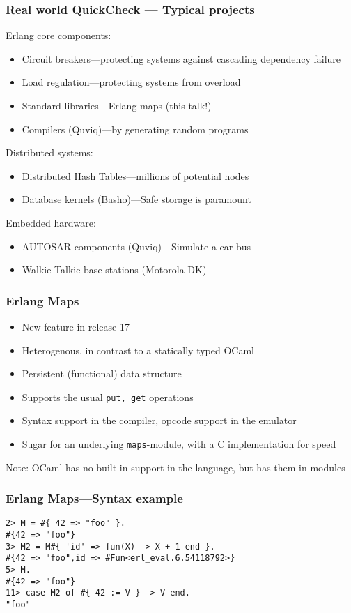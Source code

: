 \documentclass[lualatex]{beamer}
\begin{document}
\begin{frame}[fragile]
\frametitle{Real world QuickCheck — Typical projects}
Erlang core components:
\begin{itemize}
\item Circuit breakers—protecting systems against cascading dependency failure
\item Load regulation—protecting systems from overload
\item Standard libraries—Erlang maps (this talk!)
\item Compilers (Quviq)—by generating random programs
\end{itemize}
Distributed systems:
\begin{itemize}
\item Distributed Hash Tables—millions of potential nodes
\item Database kernels (Basho)—Safe storage is paramount
\end{itemize}
Embedded hardware:
\begin{itemize}
\item AUTOSAR components (Quviq)—Simulate a car bus
\item Walkie-Talkie base stations (Motorola DK)
\end{itemize}
\end{frame}

\begin{frame}
\frametitle{Erlang Maps}
\begin{itemize}
\item New feature in release 17
\item Heterogenous, in contrast to a statically typed OCaml
\item Persistent (functional) data structure
\item Supports the usual \texttt{put, get} operations
\item Syntax support in the compiler, opcode support in the emulator
\item Sugar for an underlying \texttt{maps}-module, with a C implementation for speed
\end{itemize}
Note: OCaml has no built-in support in the language, but has them in modules
\end{frame}

\begin{frame}[fragile]
\frametitle{Erlang Maps—Syntax example}
\begin{verbatim}
2> M = #{ 42 => "foo" }.
#{42 => "foo"}
3> M2 = M#{ 'id' => fun(X) -> X + 1 end }.
#{42 => "foo",id => #Fun<erl_eval.6.54118792>}
5> M.
#{42 => "foo"}
11> case M2 of #{ 42 := V } -> V end.
"foo"
\end{verbatim}
\end{frame}
\end{document}

